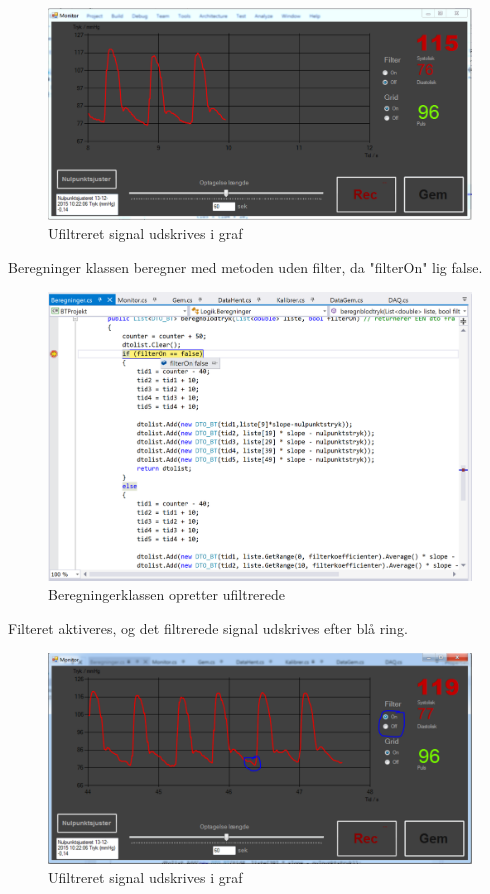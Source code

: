 \begin{figure}[H]
	\centering
	\includegraphics[width=1\textwidth]{Figurer/Test_Aktiver_1}
	\caption{Ufiltreret signal udskrives i graf}
\end{figure}

Beregninger klassen beregner med metoden uden filter, da "filterOn" lig false.

\begin{figure}[H]
	\centering
	\includegraphics[width=1\textwidth]{Figurer/Test_Aktiver_2}
	\caption{Beregningerklassen opretter ufiltrerede}
\end{figure}

Filteret aktiveres, og det filtrerede signal udskrives efter blå ring.

\begin{figure}[H]
	\centering
	\includegraphics[width=1\textwidth]{Figurer/Test_Aktiver_3}
	\caption{Ufiltreret signal udskrives i graf}
\end{figure}

